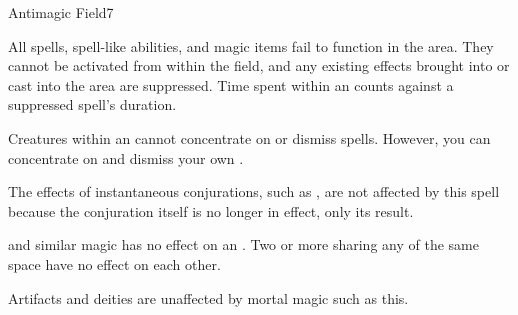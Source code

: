 \begin{spellsection}{Antimagic Field}{7}
\begin{spellheader}
\end{spellheader}
\begin{spellcontent}
    \begin{spelltargetinginfo}
    \end{spelltargetinginfo}
    \begin{spelleffects}
        \spelleffect All spells, spell-like abilities, and magic items fail to function in the area. They cannot be activated from within the field, and any existing effects brought into or cast into the area are suppressed. Time spent within an  counts against a suppressed spell's duration.
        \par Creatures within an  cannot concentrate on or dismiss spells. However, you can concentrate on and dismiss your own .
        \spelldur \durlong \dismissable
    \end{spelleffects}
\end{spellcontent}
\begin{spellfooter}
    \spellnotes The effects of instantaneous conjurations, such as , are not affected by this spell because the conjuration itself is no longer in effect, only its result.

    \par {} and similar magic has no effect on an . Two or more  sharing any of the same space have no effect on each other.
    \par Artifacts and deities are unaffected by mortal magic such as this.
\end{spellfooter}
\end{spellsection}

